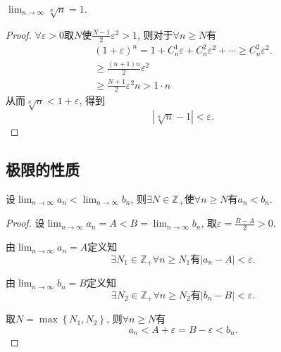 \begin{example}
    $\displaystyle \lim_{n \to \infty} \sqrt[n]{n} = 1$.
\end{example}
\begin{proof}
    $\forall \varepsilon > 0 $取$N$使$\displaystyle \frac{N-1}{2}\varepsilon^2 > 1$, 则对于$\forall n\ge N$有
    \begin{gather}
      (1+\varepsilon)^n = 1 + C_{n}^{1} \varepsilon + C_{n}^{2} \varepsilon^2 + \cdots \ge C_{n}^{2}\varepsilon^{2}.
      \\
      \ge \frac{(n+1)n}{2} \varepsilon^2 
      \\
      \ge \frac{N+1}{2}\varepsilon^2n  >1\cdot n
    \end{gather}
    从而$\sqrt[n]{n} < 1+\varepsilon$, 得到
    \begin{equation}
      |\sqrt[n]{n}-1| < \varepsilon.
    \end{equation}
\end{proof}

\subsection{极限的性质}
\begin{proposition}[充分大指标的项保持极限不等式]\label{充分大指标的项保持极限不等式}
    设$\displaystyle \lim_{n \to \infty}a_n < \lim_{n \to \infty}b_n$, 则$\exists N \in \mathbb{Z}_{+}$使$\forall  n\ge N $有$a_n < b_n$.
\end{proposition}
\begin{proof}
    设$\displaystyle \lim_{n \to \infty}a_n = A < B = \lim_{n \to \infty}b_n$, 取$\varepsilon = \frac{B-A}{2}>0$.

    由$\displaystyle \lim_{n \to \infty}a_n = A$定义知
    \begin{equation}
      \exists N_1 \in \mathbb{Z}_{+} \forall  n\ge N_1 \text{有} |a_n - A| <\varepsilon.
    \end{equation}

    由$\displaystyle \lim_{n \to \infty}b_n = B$定义知
    \begin{equation}
      \exists N_2 \in \mathbb{Z}_{+} \forall  n\ge N_2 \text{有} |b_n - B| <\varepsilon.
    \end{equation}

    取$N = \max\left\{ N_1,N_2 \right\} $, 则$\forall n \ge N$有
    \begin{equation}
      a_n<A+\varepsilon = B -\varepsilon < b_n.
    \end{equation}
\end{proof}

